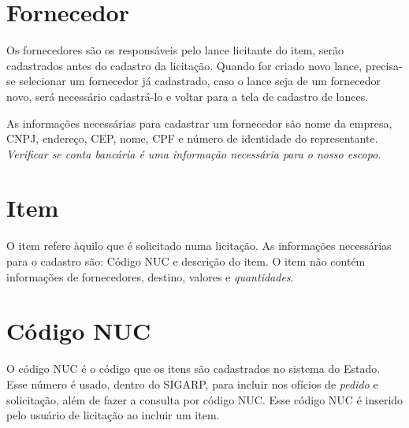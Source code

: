 \documentclass[ ]{article}
\begin{document}


\section{Fornecedor}
	Os fornecedores são os responsáveis pelo lance licitante do item, serão cadastrados antes do cadastro da licitação. Quando for criado novo lance, precisa-se selecionar um fornecedor já cadastrado, caso o lance seja de um fornecedor novo, será necessário cadastrá-lo e voltar para a tela de cadastro de lances.
	
	As informações necessárias para cadastrar um fornecedor são nome da empresa, CNPJ, endereço, CEP, nome, CPF e número de identidade do representante. \textit{Verificar se conta bancária é uma informação necessária para o nosso escopo.}
	
\section{Item}
	O item refere àquilo que é solicitado numa licitação. As informações necessárias para o cadastro são: Código NUC e descrição do item. O item não contém informações de fornecedores, destino, valores e \textit{quantidades}.
	
\section{Código NUC}
	O código NUC é o código que os itens são cadastrados no sistema do Estado. Esse número é usado, dentro do SIGARP, para incluir nos ofícios de \textit{pedido} e solicitação, além de fazer a consulta por código NUC. Esse código NUC é inserido pelo usuário de licitação ao incluir um item.
	
\end{document}
